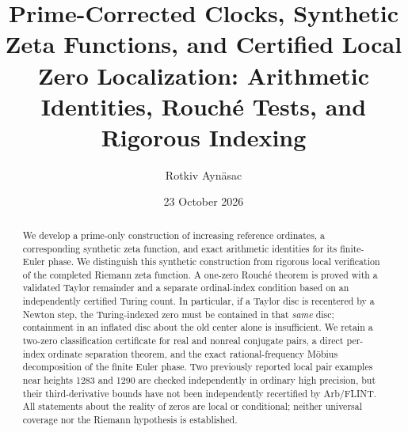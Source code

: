 \documentclass[11pt,reqno]{amsart}
\numberwithin{equation}{section}
\theoremstyle{definition}
\theoremstyle{remark}
\begin{document}
\title[Prime-corrected clocks and local certificates]{Prime-Corrected Clocks, Synthetic Zeta Functions, and Certified Local Zero Localization: Arithmetic Identities, Rouch\'e Tests, and Rigorous Indexing}
\author{Rotkiv Ayn\"asac}
\date{23 October 2026}
\begin{abstract}
We develop a prime-only construction of increasing reference ordinates, a corresponding synthetic zeta function, and exact arithmetic identities for its finite-Euler phase. We distinguish this synthetic construction from rigorous local verification of the completed Riemann zeta function. A one-zero Rouch\'e theorem is proved with a validated Taylor remainder and a separate ordinal-index condition based on an independently certified Turing count. In particular, if a Taylor disc is recentered by a Newton step, the Turing-indexed zero must be contained in that \emph{same} disc; containment in an inflated disc about the old center alone is insufficient. We retain a two-zero classification certificate for real and nonreal conjugate pairs, a direct per-index ordinate separation theorem, and the exact rational-frequency M\"obius decomposition of the finite Euler phase. Two previously reported local pair examples near heights 1283 and 1290 are checked independently in ordinary high precision, but their third-derivative bounds have not been independently recertified by Arb/FLINT. All statements about the reality of zeros are local or conditional; neither universal coverage nor the Riemann hypothesis is established.
\end{abstract}
\maketitle
\tableofcontents
\end{document}
